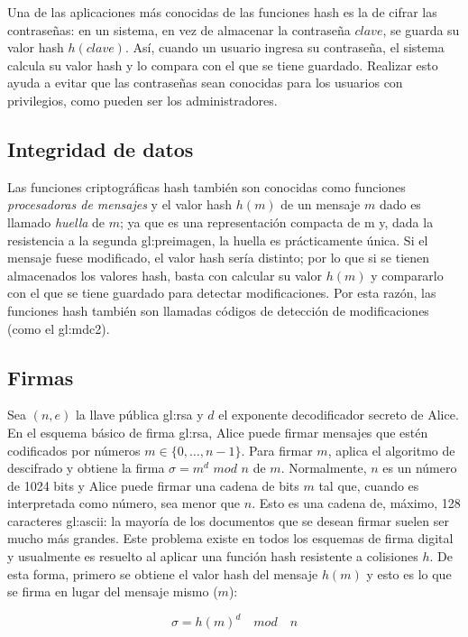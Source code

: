 Una de las aplicaciones más conocidas de las funciones hash es la de
cifrar las contraseñas: en un sistema, en vez de almacenar la contraseña
$clave$, se guarda su valor hash $h(clave)$. Así, cuando un usuario
ingresa su contraseña, el sistema calcula su valor hash y lo compara con
el que se tiene guardado. Realizar esto ayuda a evitar que las
contraseñas sean conocidas para los usuarios con privilegios, como
pueden ser los administradores.

\subsection{Integridad de datos}
Las funciones criptográficas hash también son conocidas como funciones
\textit{procesadoras de mensajes} y el valor hash $h(m)$ de un mensaje
$m$ dado es llamado \textit{huella} de $m$; ya que es una representación
compacta de m y, dada la resistencia a la segunda \gls{gl:preimagen}, la huella
es prácticamente única. Si el mensaje fuese modificado, el valor hash
sería distinto; por lo que si se tienen almacenados los valores hash,
basta con calcular su valor $h(m)$ y compararlo con el que se tiene
guardado para detectar modificaciones. Por esta razón, las funciones
hash también son llamadas códigos de detección de modificaciones (como el 
\gls{gl:mdc2}).

\subsection{Firmas}
Sea $(n, e)$ la llave pública \gls{gl:rsa} y $d$ el exponente decodificador
secreto de Alice. En el esquema básico de firma \gls{gl:rsa}, Alice puede 
firmar mensajes que estén codificados por números $ m \in \{0, \dots, n-1\}$.
Para firmar $m$, aplica el algoritmo de descifrado y obtiene la firma
$\sigma = m^d$ $mod$ $n$ de $m$.
Normalmente, $n$ es un número de 1024 bits y Alice puede firmar una
cadena de bits $m$ tal que, cuando es interpretada como número, sea
menor que $n$. Esto es una cadena de, máximo, 128 caracteres 
\gls{gl:ascii}: la mayoría de los documentos que se desean firmar suelen 
ser mucho más grandes. Este problema existe en todos los esquemas de firma 
digital y usualmente es resuelto al aplicar una función hash resistente a
colisiones $h$. De esta forma, primero se obtiene el valor hash del mensaje
$h(m)$ y esto es lo que se firma en lugar del mensaje mismo ($m$):

\begin{equation}
  \label{funcion_hash_sign}
  \sigma = h(m)^d \quad mod \quad n
\end{equation}

